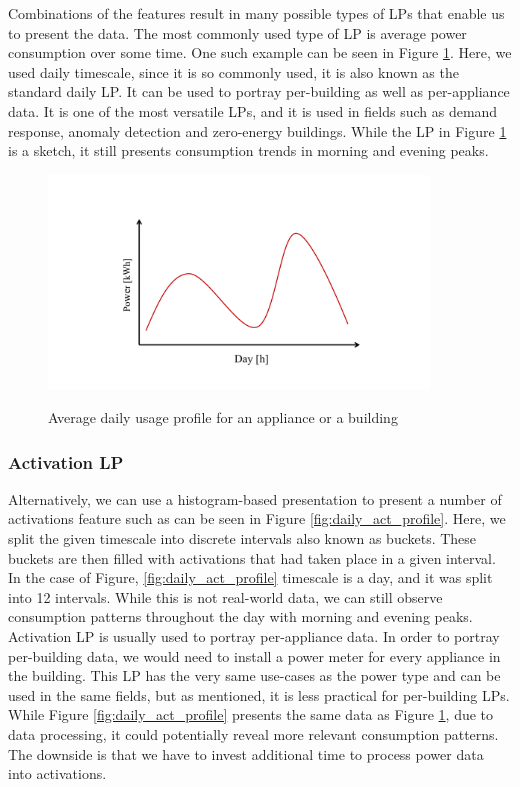 Combinations of the features result in many possible types of LPs that enable us to present the data.
The most commonly used type of LP is average power consumption over some time.
One such example can be seen in Figure \ref{fig:daily_power_profile}. 
Here, we used daily timescale, since it is so commonly used, it is also known as the standard daily LP. 
It can be used to portray per-building as well as per-appliance data.
It is one of the most versatile LPs, and it is used in fields such as demand response, anomaly detection and zero-energy buildings.
While the LP in Figure \ref{fig:daily_power_profile} is a sketch, it still presents consumption trends in morning and evening peaks.
\begin{figure}[H]
	\centering
	\caption{Average daily usage profile for an appliance or a building}
	\includegraphics[width=0.9\textwidth]{Figures/profile_sketches/slide1.pdf}
	\label{fig:daily_power_profile}
\end{figure}

\subsubsection{Activation LP}
Alternatively, we can use a histogram-based presentation to present a number of activations feature such as can be seen in Figure \ref{fig:daily_act_profile}.
Here, we split the given timescale into discrete intervals also known as buckets. 
These buckets are then filled with activations that had taken place in a given interval. 
In the case of Figure, \ref{fig:daily_act_profile} timescale is a day, and it was split into 12 intervals.
While this is not real-world data, we can still observe consumption patterns throughout the day with morning and evening peaks. 
Activation LP is usually used to portray per-appliance data. 
In order to portray per-building data, we would need to install a power meter for every appliance in the building.
This LP has the very same use-cases as the power type and can be used in the same fields, but as mentioned, it is less practical for per-building LPs.
While Figure \ref{fig:daily_act_profile} presents the same data as Figure \ref{fig:daily_power_profile},
due to data processing, it could potentially reveal more relevant consumption patterns.
The downside is that we have to invest additional time to process power data into activations.

